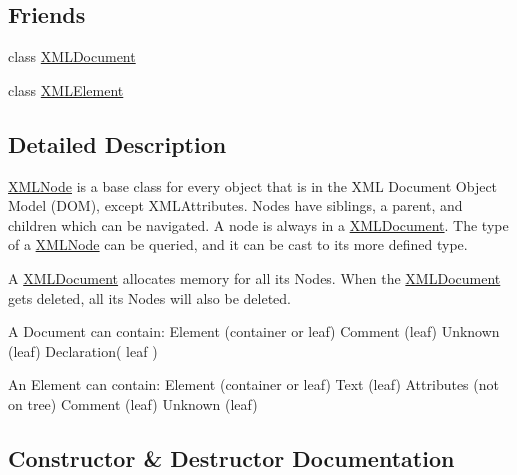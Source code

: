 \subsection*{Friends}
\begin{DoxyCompactItemize}
\item 
class \hyperlink{classtinyxml2_1_1_x_m_l_node_a4eee3bda60c60a30e4e8cd4ea91c4c6e}{X\+M\+L\+Document}
\item 
class \hyperlink{classtinyxml2_1_1_x_m_l_node_ac2fba9b6e452829dd892f7392c24e0eb}{X\+M\+L\+Element}
\end{DoxyCompactItemize}


\subsection{Detailed Description}
\hyperlink{classtinyxml2_1_1_x_m_l_node}{X\+M\+L\+Node} is a base class for every object that is in the X\+M\+L Document Object Model (D\+O\+M), except X\+M\+L\+Attributes. Nodes have siblings, a parent, and children which can be navigated. A node is always in a \hyperlink{classtinyxml2_1_1_x_m_l_document}{X\+M\+L\+Document}. The type of a \hyperlink{classtinyxml2_1_1_x_m_l_node}{X\+M\+L\+Node} can be queried, and it can be cast to its more defined type.

A \hyperlink{classtinyxml2_1_1_x_m_l_document}{X\+M\+L\+Document} allocates memory for all its Nodes. When the \hyperlink{classtinyxml2_1_1_x_m_l_document}{X\+M\+L\+Document} gets deleted, all its Nodes will also be deleted.

\begin{DoxyVerb}A Document can contain: Element (container or leaf)
                        Comment (leaf)
                        Unknown (leaf)
                        Declaration( leaf )

An Element can contain: Element (container or leaf)
                        Text    (leaf)
                        Attributes (not on tree)
                        Comment (leaf)
                        Unknown (leaf)\end{DoxyVerb}
 

\subsection{Constructor \& Destructor Documentation}
\hypertarget{classtinyxml2_1_1_x_m_l_node_a29868df6ca383d574f584dfdd15105b6}{}
